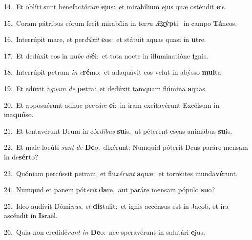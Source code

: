 {\numbfont\textcolor{\numbcolor}{14.}}~Et oblíti sunt benefac\-\textit{tó}\-\textit{rum} \textbf{e}\-jus:~\star et mirabílium ejus quæ osténdit \textbf{e}\-is.\par
{\numbfont\textcolor{\numbcolor}{15.}}~Coram pátribus eórum fecit mirabília in ter\textit{ra} \textit{Æ}\-\textbf{gýp}ti:~\star in campo \textbf{Tá}\-neos.\par
{\numbfont\textcolor{\numbcolor}{16.}}~Interrúpit mare, et per\-\textit{dú}\-\textit{xit} \textbf{e}\-os:~\star et státuit aquas quasi in \textbf{u}\-tre.\par
{\numbfont\textcolor{\numbcolor}{17.}}~Et dedúxit eos in nu\textit{be} \textit{di}\-\textbf{é}i:~\star et tota nocte in illuminatióne \textbf{i}\-gnis.\par
{\numbfont\textcolor{\numbcolor}{18.}}~Interrúpit petram \textit{in} \textit{e}\-\textbf{ré}mo:~\star et adaquávit eos velut in abýsso \textbf{mul}\-ta.\par
{\numbfont\textcolor{\numbcolor}{19.}}~Et edúxit a\textit{quam} \textit{de} \textbf{pe}\-tra:~\star et dedúxit tamquam flúmina \textbf{a}\-quas.\par
{\numbfont\textcolor{\numbcolor}{20.}}~Et apposuérunt adhuc pec\-\textit{cá}\-\textit{re} \textbf{e}\-i:~\star in iram excitavérunt Excélsum in ina\-\textbf{quó}\-so.\par
{\numbfont\textcolor{\numbcolor}{21.}}~Et tentavérunt Deum in cór\-\textit{di}\-\textit{bus} \textbf{su}\-is,~\star ut péterent escas animábus \textbf{su}\-is.\par
{\numbfont\textcolor{\numbcolor}{22.}}~Et male locúti \textit{sunt} \textit{de} \textbf{De}\-o:~\star dixérunt: Numquid póterit Deus paráre mensam in de\-\textbf{sér}\-to?\par
{\numbfont\textcolor{\numbcolor}{23.}}~Quóniam percússit petram, et flu\-\textit{xé}\-\textit{runt} \textbf{a}\-quæ:~\star et torréntes inunda\-\textbf{vé}\-runt.\par
{\numbfont\textcolor{\numbcolor}{24.}}~Numquid et panem pót\-\textit{e}\-\textit{rit} \textbf{da}\-re,~\star aut paráre mensam pópulo \textbf{su}\-o?\par
{\numbfont\textcolor{\numbcolor}{25.}}~Ideo audívit Dómi\-\textit{nus}\-, \textit{et} \textbf{dís}\-tulit:~\star et ignis accénsus est in Jacob, et ira ascéndit in \textbf{Is}\-raël.\par
{\numbfont\textcolor{\numbcolor}{26.}}~Quia non credidé\textit{runt} \textit{in} \textbf{De}\-o:~\star nec speravérunt in salutári \textbf{e}\-jus:\par
